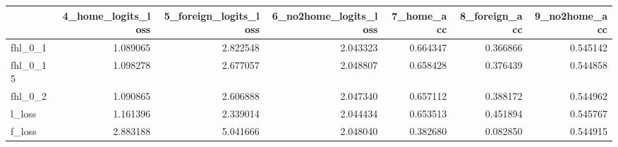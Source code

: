 \begin{tabular}{lrrrrrr}
\toprule
 & 4_home_logits_loss & 5_foreign_logits_loss & 6_no2home_logits_loss & 7_home_acc & 8_foreign_acc & 9_no2home_acc \\
\midrule
fhl_0_1 & 1.089065 & 2.822548 & 2.043323 & 0.664347 & 0.366866 & 0.545142 \\
fhl_0_15 & 1.098278 & 2.677057 & 2.048807 & 0.658428 & 0.376439 & 0.544858 \\
fhl_0_2 & 1.090865 & 2.606888 & 2.047340 & 0.657112 & 0.388172 & 0.544962 \\
l_loss & 1.161396 & 2.339014 & 2.044434 & 0.653513 & 0.451894 & 0.545767 \\
f_loss & 2.883188 & 5.041666 & 2.048040 & 0.382680 & 0.082850 & 0.544915 \\
\bottomrule
\end{tabular}

